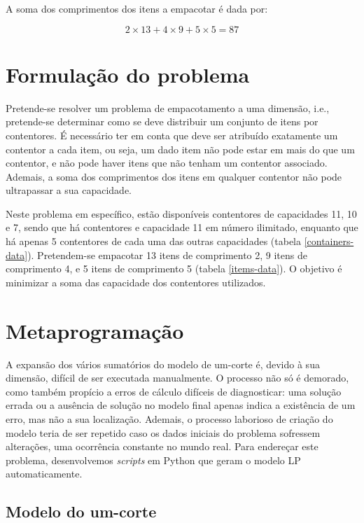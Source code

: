 \documentclass[12pt, a4paper, titlepage]{article}
\begin{document}
A soma dos comprimentos dos itens a empacotar é dada por:

$$2 \times 13 + 4 \times 9 + 5 \times 5 = 87$$

\section{Formulação do problema}

Pretende-se resolver um problema de empacotamento a uma dimensão, i.e., pretende-se determinar como
se deve distribuir um conjunto de itens por contentores. É necessário ter em conta que deve ser
atribuído exatamente um contentor a cada item, ou seja, um dado item não pode estar em mais do que
um contentor, e não pode haver itens que não tenham um contentor associado. Ademais, a soma dos
comprimentos dos itens em qualquer contentor não pode ultrapassar a sua capacidade.

Neste problema em específico, estão disponíveis contentores de capacidades 11, 10 e 7, sendo que há
contentores e capacidade 11 em número ilimitado, enquanto que há apenas 5 contentores de cada uma
das outras capacidades (tabela \ref{containers-data}). Pretendem-se empacotar 13 itens de
comprimento 2, 9 itens de comprimento 4, e 5 itens de comprimento 5 (tabela \ref{items-data}). O
objetivo é minimizar a soma das capacidade dos contentores utilizados.


\section{Metaprogramação}

A expansão dos vários sumatórios do modelo de um-corte é, devido à sua dimensão, difícil de ser
executada manualmente. O processo não só é demorado, como também propício a erros de cálculo
difíceis de diagnosticar: uma solução errada ou a ausência de solução no modelo final apenas indica
a existência de um erro, mas não a sua localização. Ademais, o processo laborioso de criação do
modelo teria de ser repetido caso os dados iniciais do problema sofressem alterações, uma ocorrência
constante no mundo real. Para endereçar este problema, desenvolvemos \emph{scripts} em Python que
geram o modelo LP automaticamente.

\subsection{Modelo do um-corte}
\end{document}
